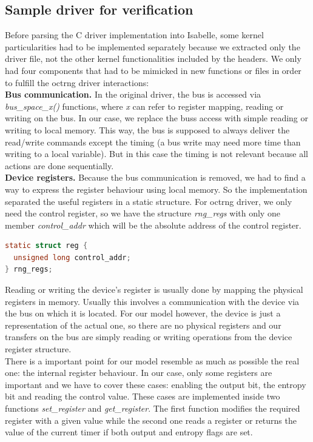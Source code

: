 \documentclass[conference]{IEEEtran}
\begin{document}
\subsection{Sample driver for verification}
Before parsing the C driver implementation into Isabelle, some kernel particularities had to be implemented separately because we extracted only the driver file, not the other kernel functionalities included by the headers. We only had four components that had to be mimicked in new functions or files in order to fulfill the octrng driver interactions:\\
\textbf{Bus communication.} In the original driver, the bus is accessed via \textit{bus\_space\_x()} functions, where \textit{x} can refer to register mapping, reading or writing on the bus. In our case, we replace the buss access with simple reading or writing to local memory. This way, the bus is supposed to always deliver the read/write commands except the timing (a bus write may need more time than writing to a local variable). But in this case the timing is not relevant because all actions are done sequentially.\\
\textbf{Device registers.} Because the bus communication is removed, we had to find a way to express the register behaviour using local memory. So the implementation separated the useful registers in a static structure. For octrng driver, we only need the control register, so we have the structure \textit{rng\_regs} with only one member \textit{control\_addr} which will be the absolute address of the control register.
\begin{lstlisting}[language=C]
static struct reg {
  unsigned long control_addr;
} rng_regs;
\end{lstlisting}
Reading or writing the device’s register is usually done by mapping the physical registers in memory. Usually this involves a communication with the device via the bus on which it is located. For our model however, the device is just a representation of the actual one, so there are no physical registers and our transfers on the bus are simply reading or writing operations from the device register structure. \\
There is a important point for our model resemble as much as possible the real one: the internal register behaviour. In our case, only some registers are important and we have to cover these cases: enabling the output bit, the entropy bit and reading the control value. These cases are implemented inside two functions \textit{set\_register} and \textit{get\_register}. The first function modifies the required register with a given value while the second one reads a register or returns the value of the current timer if both output and entropy flags are set. \\
\end{document}
